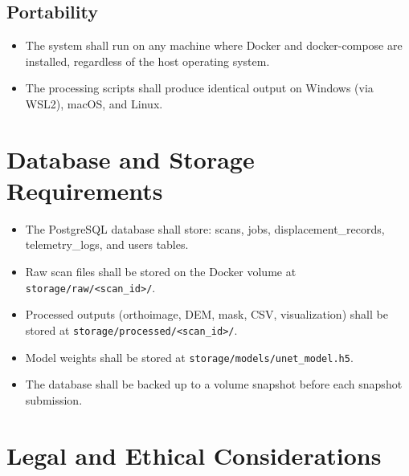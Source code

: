\documentclass{article}
\begin{document}
\subsection{Portability}
\begin{itemize}
  \item The system shall run on any machine where Docker and docker-compose are
    installed, regardless of the host operating system.
  \item The processing scripts shall produce identical output on Windows (via WSL2),
    macOS, and Linux.
\end{itemize}

\section{Database and Storage Requirements}

\begin{itemize}
  \item The PostgreSQL database shall store: scans, jobs, displacement\_records,
    telemetry\_logs, and users tables.
  \item Raw scan files shall be stored on the Docker volume at
    \texttt{storage/raw/<scan\_id>/}.
  \item Processed outputs (orthoimage, DEM, mask, CSV, visualization) shall be stored
    at \texttt{storage/processed/<scan\_id>/}.
  \item Model weights shall be stored at
    \texttt{storage/models/unet\_model.h5}.
  \item The database shall be backed up to a volume snapshot before each snapshot
    submission.
\end{itemize}

\section{Legal and Ethical Considerations}
\label{sec:legal}
\end{document}
